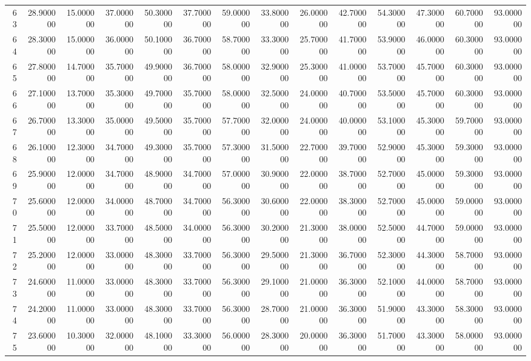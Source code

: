 \begin{tabular}{rrrrrrrrrrrrrr}
63 & 28.900000 & 15.000000 & 37.000000 & 50.300000 & 37.700000 & 59.000000 & 33.800000 & 26.000000 & 42.700000 & 54.300000 & 47.300000 & 60.700000 & 93.000000 \\
64 & 28.300000 & 15.000000 & 36.000000 & 50.100000 & 36.700000 & 58.700000 & 33.300000 & 25.700000 & 41.700000 & 53.900000 & 46.000000 & 60.300000 & 93.000000 \\
65 & 27.800000 & 14.700000 & 35.700000 & 49.900000 & 36.700000 & 58.000000 & 32.900000 & 25.300000 & 41.000000 & 53.700000 & 45.700000 & 60.300000 & 93.000000 \\
66 & 27.100000 & 13.700000 & 35.300000 & 49.700000 & 35.700000 & 58.000000 & 32.500000 & 24.000000 & 40.700000 & 53.500000 & 45.700000 & 60.300000 & 93.000000 \\
67 & 26.700000 & 13.300000 & 35.000000 & 49.500000 & 35.700000 & 57.700000 & 32.000000 & 24.000000 & 40.000000 & 53.100000 & 45.300000 & 59.700000 & 93.000000 \\
68 & 26.100000 & 12.300000 & 34.700000 & 49.300000 & 35.700000 & 57.300000 & 31.500000 & 22.700000 & 39.700000 & 52.900000 & 45.300000 & 59.300000 & 93.000000 \\
69 & 25.900000 & 12.000000 & 34.700000 & 48.900000 & 34.700000 & 57.000000 & 30.900000 & 22.000000 & 38.700000 & 52.700000 & 45.000000 & 59.300000 & 93.000000 \\
70 & 25.600000 & 12.000000 & 34.000000 & 48.700000 & 34.700000 & 56.300000 & 30.600000 & 22.000000 & 38.300000 & 52.700000 & 45.000000 & 59.000000 & 93.000000 \\
71 & 25.500000 & 12.000000 & 33.700000 & 48.500000 & 34.000000 & 56.300000 & 30.200000 & 21.300000 & 38.000000 & 52.500000 & 44.700000 & 59.000000 & 93.000000 \\
72 & 25.200000 & 12.000000 & 33.000000 & 48.300000 & 33.700000 & 56.300000 & 29.500000 & 21.300000 & 36.700000 & 52.300000 & 44.300000 & 58.700000 & 93.000000 \\
73 & 24.600000 & 11.000000 & 33.000000 & 48.300000 & 33.700000 & 56.300000 & 29.100000 & 21.000000 & 36.300000 & 52.100000 & 44.000000 & 58.700000 & 93.000000 \\
74 & 24.200000 & 11.000000 & 33.000000 & 48.300000 & 33.700000 & 56.300000 & 28.700000 & 21.000000 & 36.300000 & 51.900000 & 43.300000 & 58.300000 & 93.000000 \\
75 & 23.600000 & 10.300000 & 32.000000 & 48.100000 & 33.300000 & 56.000000 & 28.300000 & 20.000000 & 36.300000 & 51.700000 & 43.300000 & 58.000000 & 93.000000 \\

\end{tabular}
